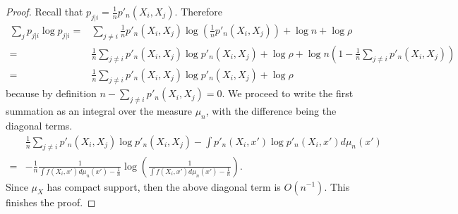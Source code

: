\begin{proof}
    Recall that $p_{j|i} = \frac{1}{n}p'_n(X_i,X_j)$. Therefore
    \begin{align}
        \sum_j p_{j|i} \log p_{j|i} = & \sum_{j \neq i} \frac{1}{n}p'_n(X_i,X_j) \log \left(\frac{1}{n}p'_n(X_i,X_j) \right ) + \log n + \log \rho \nonumber                                  \\
        =                             & \frac{1}{n} \sum_{j \neq i} p'_n(X_i,X_j) \log p'_n(X_i,X_j) + \log \rho + \log n \left(1 - \frac{1}{n}\sum_{j \neq i} p'_n(X_i,X_j)\right) \nonumber \\
        =                             & \frac{1}{n} \sum_{j \neq i} p'_n(X_i,X_j) \log p'_n(X_i,X_j) + \log \rho
    \end{align}
    because by definition $n - \sum_{j \neq i} p'_n(X_i,X_j) = 0$. We proceed to write the first summation as an integral over the measure $\mu_n$, with the difference being the diagonal terms.
    \begin{align} \label{p_convergence:diagonal_term}
          & \frac{1}{n} \sum_{j \neq i} p'_n(X_i,X_j) \log p'_n(X_i,X_j) - \int p'_n(X_i,x') \log p'_n(X_i,x') d\mu_n(x') \nonumber     \\
        = & -\frac{1}{n}\frac{1}{\int f(X_i,x')d\mu_n(x')-\frac{1}{n}}\log \left(\frac{1}{\int f(X_i,x')d\mu_n(x')-\frac{1}{n}}\right).
    \end{align}
    Since $\mu_X$ has compact support, then the above diagonal term is $O(n^{-1})$. This finishes the proof.
\end{proof}
